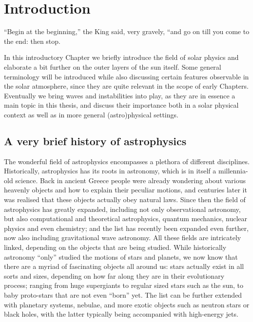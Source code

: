 \chapter{Introduction} \label{ch: introduction}

\graphicspath{{01-introduction/figures/}}

\begin{chapterquote}
  ``Begin at the beginning,'' the King said, very gravely,
  ``and go on till you come to the end: then stop.
\end{chapterquote}

In this introductory Chapter we briefly introduce the field of solar physics and elaborate a bit further on the outer layers of the sun itself. Some general terminology will be introduced while also discussing certain features observable in the solar atmosphere, since they are quite relevant in the scope of early Chapters. Eventually we bring waves and instabilities into play, as they are in essence a main topic in this thesis, and discuss their importance both in a solar physical context as well as in more general (astro)physical settings.

\section{A very brief history of astrophysics}
The wonderful field of astrophysics encompasses a plethora of different disciplines. Historically, astrophysics has its roots in astronomy, which is in itself a millennia-old science. Back in ancient Greece people were already wondering about various heavenly objects and how to explain their peculiar motions, and centuries later it was realised that these objects actually obey natural laws. Since then the field of astrophysics has greatly expanded, including not only observational astronomy, but also computational and theoretical astrophysics, quantum mechanics, nuclear physics and even chemistry; and the list has recently been expanded even further, now also including gravitational wave astronomy. All these fields are intricately linked, depending on the objects that are being studied. While historically astronomy ``only'' studied the motions of stars and planets, we now know that there are a myriad of fascinating objects all around us: stars actually exist in all sorts and sizes, depending on how far along they are in their evolutionary process; ranging from huge supergiants to regular sized stars such as the sun, to baby proto-stars that are not even ``born'' yet. The list can be further extended with planetary systems, nebulae, and more exotic objects such as neutron stars or black holes, with the latter typically being accompanied with high-energy jets.

